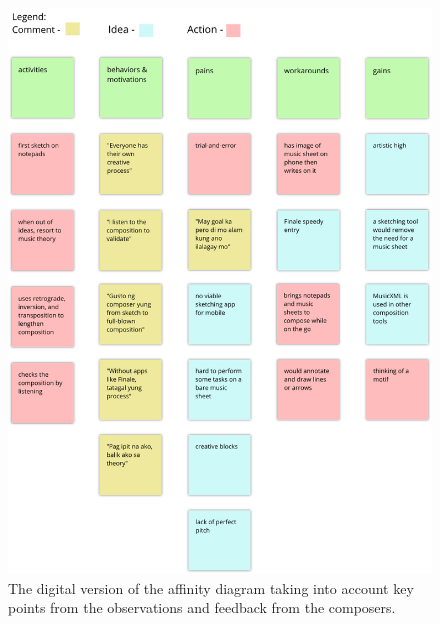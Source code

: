 		\begin{figure}[H]
			\centering
			\includegraphics[scale=0.45]{figures/affinity_diagram.png}
		    \caption{The digital version of the affinity diagram taking into account key points from the observations and feedback from the composers. }
		    \label{fig:affinity-diagram}
		\end{figure} 

